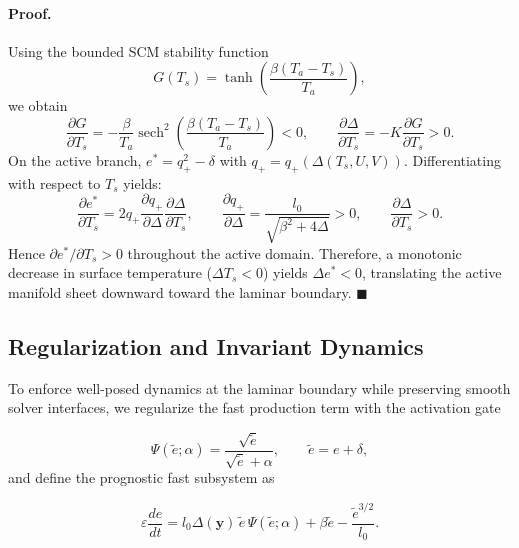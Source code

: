\documentclass[11pt,letterpaper]{article}
\begin{document}
\paragraph{Proof.}
Using the bounded SCM stability function
\begin{equation}
G(T_s)=\tanh\!\left(\frac{\beta(T_a-T_s)}{T_a}\right),
\end{equation}
we obtain
\begin{equation}
\frac{\partial G}{\partial T_s}=-\frac{\beta}{T_a}\operatorname{sech}^2\!\left(\frac{\beta(T_a-T_s)}{T_a}\right)<0,
\qquad
\frac{\partial \Delta}{\partial T_s}=-K\frac{\partial G}{\partial T_s}>0.
\end{equation}
On the active branch, $e^*=q_{+}^2-\delta$ with $q_{+}=q_{+}(\Delta(T_s,U,V))$. Differentiating with respect to $T_s$ yields:
\begin{equation}
\frac{\partial e^*}{\partial T_s}=2q_{+}\frac{\partial q_{+}}{\partial \Delta}\frac{\partial \Delta}{\partial T_s},
\qquad
\frac{\partial q_{+}}{\partial \Delta}=\frac{l_0}{\sqrt{\beta^2+4\Delta}}>0,
\qquad
\frac{\partial \Delta}{\partial T_s}>0.
\end{equation}
Hence $\partial e^*/\partial T_s>0$ throughout the active domain. Therefore, a monotonic decrease in surface temperature ($\Delta T_s<0$) yields $\Delta e^*<0$, translating the active manifold sheet downward toward the laminar boundary. $\blacksquare$

\subsection{Regularization and Invariant Dynamics}
\label{subsec:regularization_unified}

To enforce well-posed dynamics at the laminar boundary while preserving smooth solver interfaces, we regularize the fast production term with the activation gate

\begin{equation}
\Psi(\tilde e;\alpha)=\frac{\sqrt{\tilde e}}{\sqrt{\tilde e}+\alpha},
\qquad \tilde e=e+\delta,
\end{equation}
and define the prognostic fast subsystem as

\begin{equation}
\varepsilon\frac{de}{dt}=l_0\Delta(\mathbf{y})\,\tilde e\,\Psi(\tilde e;\alpha)+\beta\tilde e-\frac{\tilde e^{3/2}}{l_0}.
\label{eq:gated_fast_operator}
\end{equation}
\end{document}
